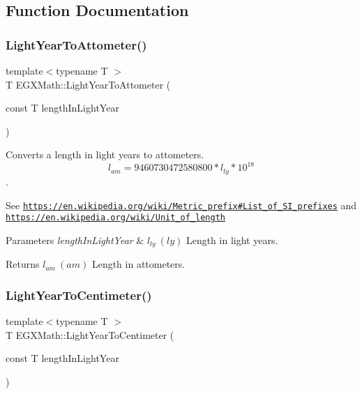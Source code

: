 \subsection{Function Documentation}
\mbox{\label{group___e_g_x_math-_conversions-_length_conversions-_astronomical-_light_year-_s_i_ga3610878361df6a45432eb294c527cdfa}} 
\subsubsection{\texorpdfstring{Light\+Year\+To\+Attometer()}{LightYearToAttometer()}}
{\footnotesize\ttfamily template$<$typename T $>$ \\
T E\+G\+X\+Math\+::\+Light\+Year\+To\+Attometer (\begin{DoxyParamCaption}\item[{const T}]{length\+In\+Light\+Year }\end{DoxyParamCaption})}



Converts a length in light years to attometers. \[ l_{am}=9460730472580800 * l_{ly} * 10^{18} \]. 

See \href{https://en.wikipedia.org/wiki/Metric_prefix#List_of_SI_prefixes}{\tt https\+://en.\+wikipedia.\+org/wiki/\+Metric\+\_\+prefix\#\+List\+\_\+of\+\_\+\+S\+I\+\_\+prefixes} and \href{https://en.wikipedia.org/wiki/Unit_of_length}{\tt https\+://en.\+wikipedia.\+org/wiki/\+Unit\+\_\+of\+\_\+length} 
\begin{DoxyParams}{Parameters}
{\em length\+In\+Light\+Year} & $ l_{ly}\ (ly)$ Length in light years. \\
\hline
\end{DoxyParams}
\begin{DoxyReturn}{Returns}
$ l_{am}\ (am)$ Length in attometers. 
\end{DoxyReturn}
\mbox{\label{group___e_g_x_math-_conversions-_length_conversions-_astronomical-_light_year-_s_i_ga25de36bdf4c3baef9594a03a8c986957}} 
\subsubsection{\texorpdfstring{Light\+Year\+To\+Centimeter()}{LightYearToCentimeter()}}
{\footnotesize\ttfamily template$<$typename T $>$ \\
T E\+G\+X\+Math\+::\+Light\+Year\+To\+Centimeter (\begin{DoxyParamCaption}\item[{const T}]{length\+In\+Light\+Year }\end{DoxyParamCaption})}



